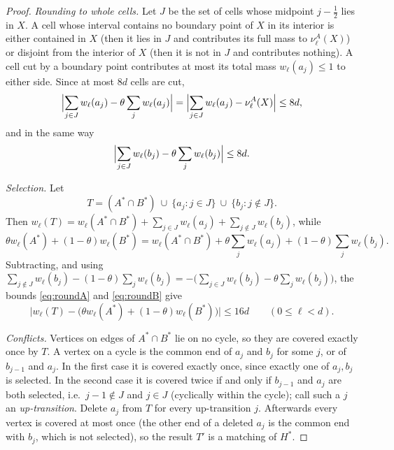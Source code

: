\documentclass[11pt,a4paper]{article}
\theoremstyle{plain}
\theoremstyle{definition}
\theoremstyle{remark}
\begin{document}
\begin{proof}
\emph{Rounding to whole cells.} Let $J$ be the set of cells whose midpoint $j-\frac12$ lies in $X$. A cell whose interval contains no boundary point of $X$ in its interior is either contained in $X$ (then it lies in $J$ and contributes its full mass to $\nu^A_\ell(X)$) or disjoint from the interior of $X$ (then it is not in $J$ and contributes nothing). A cell cut by a boundary point contributes at most its total mass $w_\ell(a_j)\le1$ to either side. Since at most $8d$ cells are cut,
\begin{equation}\label{eq:roundA}
 \Bigl|\sum_{j\in J}w_\ell(a_j)-\theta\sum_{j}w_\ell(a_j)\Bigr|=\Bigl|\sum_{j\in J}w_\ell(a_j)-\nu^A_\ell(X)\Bigr|\le8d,
\end{equation}
and in the same way
\begin{equation}\label{eq:roundB}
 \Bigl|\sum_{j\in J}w_\ell(b_j)-\theta\sum_{j}w_\ell(b_j)\Bigr|\le8d .
\end{equation}

\emph{Selection.} Let
\[
 T=(A^*\cap B^*)\ \cup\ \{a_j:j\in J\}\ \cup\ \{b_j:j\notin J\}.
\]
Then $w_\ell(T)=w_\ell(A^*\cap B^*)+\sum_{j\in J}w_\ell(a_j)+\sum_{j\notin J}w_\ell(b_j)$, while
\[
 \theta w_\ell(A^*)+(1-\theta)w_\ell(B^*)=w_\ell(A^*\cap B^*)+\theta\sum_jw_\ell(a_j)+(1-\theta)\sum_jw_\ell(b_j).
\]
Subtracting, and using $\sum_{j\notin J}w_\ell(b_j)-(1-\theta)\sum_jw_\ell(b_j)=-\bigl(\sum_{j\in J}w_\ell(b_j)-\theta\sum_jw_\ell(b_j)\bigr)$, the bounds \eqref{eq:roundA} and \eqref{eq:roundB} give
\begin{equation}\label{eq:preRepair}
 \bigl|w_\ell(T)-\bigl(\theta w_\ell(A^*)+(1-\theta)w_\ell(B^*)\bigr)\bigr|\le16d\qquad(0\le\ell<d).
\end{equation}

\emph{Conflicts.} Vertices on edges of $A^*\cap B^*$ lie on no cycle, so they are covered exactly once by $T$. A vertex on a cycle is the common end of $a_j$ and $b_j$ for some $j$, or of $b_{j-1}$ and $a_j$. In the first case it is covered exactly once, since exactly one of $a_j,b_j$ is selected. In the second case it is covered twice if and only if $b_{j-1}$ and $a_j$ are both selected, i.e.\ $j-1\notin J$ and $j\in J$ (cyclically within the cycle); call such a $j$ an \emph{up-transition}. Delete $a_j$ from $T$ for every up-transition $j$. Afterwards every vertex is covered at most once (the other end of a deleted $a_j$ is the common end with $b_j$, which is not selected), so the result $T'$ is a matching of $H^*$.


\end{proof}
\end{document}
